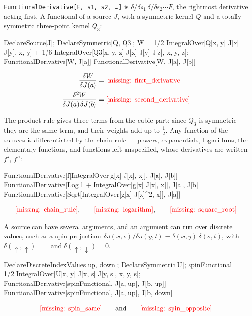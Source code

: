 \documentclass[11pt,a4paper]{article}
\newcommand{\formula}[1]{\IfFileExists{figures/formula_#1.tex}{}{\text{\textcolor{red}{[missing: \detokenize{#1}]}}}}
\newcommand{\pkg}[1]{\texttt{#1}}
\begin{document}
\pkg{FunctionalDerivative[F, s1, s2, \dots]} is $\delta/\delta s_1\,\delta/\delta s_2\cdots F$, the rightmost derivative
acting first. A functional of a source $J$, with a symmetric kernel $Q$ and a totally symmetric three-point kernel
$Q_3$:
\begin{code}
DeclareSource[J]; DeclareSymmetric[Q, Q3];
W = 1/2 IntegralOver[Q[x, y] J[x] J[y], {x, y}] +
    1/6 IntegralOver[Q3[x, y, z] J[x] J[y] J[z], {x, y, z}];
FunctionalDerivative[W, J[a]]
FunctionalDerivative[W, J[a], J[b]]
\end{code}
\begin{outputbox}
\vspace{-6pt}
\begin{align*}
\frac{\delta W}{\delta J(a)}&=\formula{first_derivative}\\
\frac{\delta^2 W}{\delta J(a)\,\delta J(b)}&=\formula{second_derivative}
\end{align*}
\end{outputbox}
The product rule gives three terms from the cubic part; since $Q_3$ is symmetric they are the same term, and their
weights add up to $\frac12$. Any function of the sources is differentiated by the chain rule --- powers, exponentials,
logarithms, the elementary functions, and functions left unspecified, whose derivatives are written $f'$, $f''$:
\begin{code}
FunctionalDerivative[f[IntegralOver[g[x] J[x], {x}]], J[a], J[b]]
FunctionalDerivative[Log[1 + IntegralOver[g[x] J[x], {x}]], J[a], J[b]]
FunctionalDerivative[Sqrt[IntegralOver[g[x] J[x]^2, {x}]], J[a]]
\end{code}
\begin{outputbox}
\vspace{-6pt}
\begin{gather*}
\formula{chain_rule},\qquad \formula{logarithm},\qquad \formula{square_root}
\end{gather*}
\end{outputbox}
A source can have several arguments, and an argument can run over discrete values, such as a spin projection:
$\delta J(x,s)/\delta J(y,t)=\delta(x,y)\,\delta(s,t)$, with $\delta(\uparrow,\uparrow)=1$ and $\delta(\uparrow,\downarrow)=0$.
\begin{code}
DeclareDiscreteIndexValues[{up, down}]; DeclareSymmetric[U];
spinFunctional = 1/2 IntegralOver[U[x, y] J[x, s] J[y, s], {x, y, s}];
FunctionalDerivative[spinFunctional, J[a, up], J[b, up]]
FunctionalDerivative[spinFunctional, J[a, up], J[b, down]]
\end{code}
\begin{outputbox}
\vspace{-6pt}
\[
\formula{spin_same}\qquad\text{and}\qquad\formula{spin_opposite}
\]
\end{outputbox}
\end{document}
